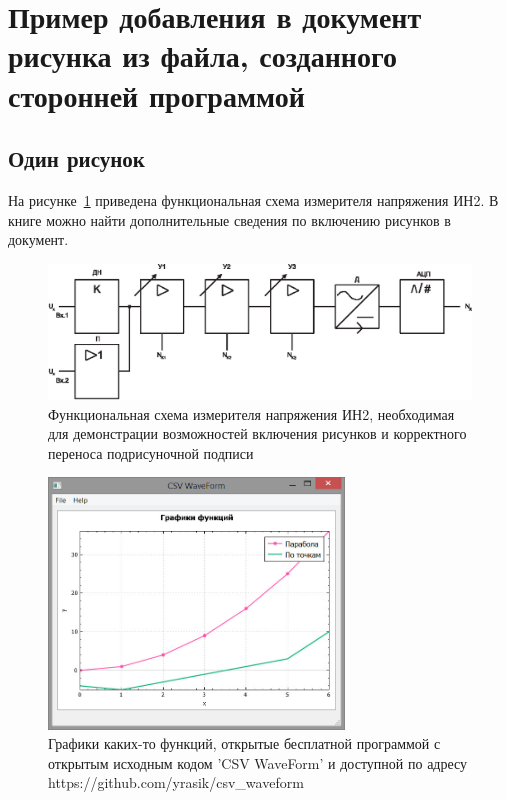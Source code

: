 \section{Пример добавления в документ рисунка из файла, созданного сторонней программой}

\subsection{Один рисунок}

На рисунке~\ref{p:func_in2_1} приведена функциональная 
схема измерителя напряжения ИН2. В книге \cite{gussens} можно найти дополнительные сведения по включению рисунков в документ.


\begin{figure}[H]
  \includegraphics[width=1\textwidth]{./about/func_in}
  \caption{Функциональная схема измерителя напряжения ИН2, необходимая для демонстрации возможностей включения рисунков и корректного переноса подрисуночной подписи} \label{p:func_in2_1}
\end{figure}


\begin{figure}[H]
  \centering
  \includegraphics[width=0.7\textwidth]{./about/scv_waveform/csv_waveform.jpg}
  \caption{Графики каких-то функций, открытые бесплатной программой с открытым исходным кодом 'CSV WaveForm' и доступной по адресу https://github.com/yrasik/csv\_waveform} \label{pic:scv_waveform}
\end{figure}



